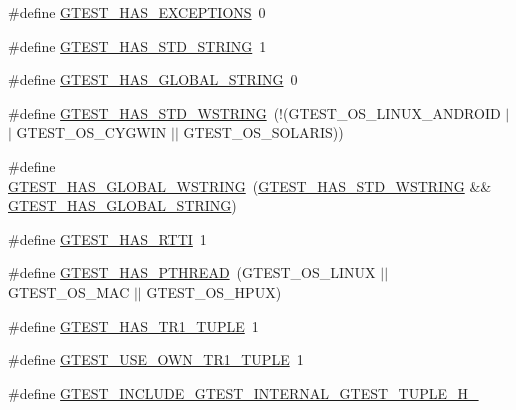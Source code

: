 \begin{DoxyCompactItemize}
\item 
\#define \hyperlink{fused-src_2gtest_2gtest_8h_aedcf220690e6589d0fc2bd3db768ea66}{\-G\-T\-E\-S\-T\-\_\-\-H\-A\-S\-\_\-\-E\-X\-C\-E\-P\-T\-I\-O\-N\-S}~0
\item 
\#define \hyperlink{fused-src_2gtest_2gtest_8h_adba1121430c11cee8ba0c74e8cf6aa40}{\-G\-T\-E\-S\-T\-\_\-\-H\-A\-S\-\_\-\-S\-T\-D\-\_\-\-S\-T\-R\-I\-N\-G}~1
\item 
\#define \hyperlink{fused-src_2gtest_2gtest_8h_a6ab57c4a17233dd4ed30c2926bb99cc5}{\-G\-T\-E\-S\-T\-\_\-\-H\-A\-S\-\_\-\-G\-L\-O\-B\-A\-L\-\_\-\-S\-T\-R\-I\-N\-G}~0
\item 
\#define \hyperlink{fused-src_2gtest_2gtest_8h_a6e087748d8bbd2ca57c487b6ad268670}{\-G\-T\-E\-S\-T\-\_\-\-H\-A\-S\-\_\-\-S\-T\-D\-\_\-\-W\-S\-T\-R\-I\-N\-G}~(!(\-G\-T\-E\-S\-T\-\_\-\-O\-S\-\_\-\-L\-I\-N\-U\-X\-\_\-\-A\-N\-D\-R\-O\-I\-D $|$$|$ \-G\-T\-E\-S\-T\-\_\-\-O\-S\-\_\-\-C\-Y\-G\-W\-I\-N $|$$|$ \-G\-T\-E\-S\-T\-\_\-\-O\-S\-\_\-\-S\-O\-L\-A\-R\-I\-S))
\item 
\#define \hyperlink{fused-src_2gtest_2gtest_8h_afca9ecaf5846561187a15b75013aa85b}{\-G\-T\-E\-S\-T\-\_\-\-H\-A\-S\-\_\-\-G\-L\-O\-B\-A\-L\-\_\-\-W\-S\-T\-R\-I\-N\-G}~(\hyperlink{gtest-port_8h_a6e087748d8bbd2ca57c487b6ad268670}{\-G\-T\-E\-S\-T\-\_\-\-H\-A\-S\-\_\-\-S\-T\-D\-\_\-\-W\-S\-T\-R\-I\-N\-G} \&\& \hyperlink{gtest-port_8h_a6ab57c4a17233dd4ed30c2926bb99cc5}{\-G\-T\-E\-S\-T\-\_\-\-H\-A\-S\-\_\-\-G\-L\-O\-B\-A\-L\-\_\-\-S\-T\-R\-I\-N\-G})
\item 
\#define \hyperlink{fused-src_2gtest_2gtest_8h_a9ba781217167f905bff2f1c410a97930}{\-G\-T\-E\-S\-T\-\_\-\-H\-A\-S\-\_\-\-R\-T\-T\-I}~1
\item 
\#define \hyperlink{fused-src_2gtest_2gtest_8h_a3341397e1952de0b9cd88762d4d3ae4b}{\-G\-T\-E\-S\-T\-\_\-\-H\-A\-S\-\_\-\-P\-T\-H\-R\-E\-A\-D}~(\-G\-T\-E\-S\-T\-\_\-\-O\-S\-\_\-\-L\-I\-N\-U\-X $|$$|$ \-G\-T\-E\-S\-T\-\_\-\-O\-S\-\_\-\-M\-A\-C $|$$|$ \-G\-T\-E\-S\-T\-\_\-\-O\-S\-\_\-\-H\-P\-U\-X)
\item 
\#define \hyperlink{fused-src_2gtest_2gtest_8h_a6de49dd4cbae1db15dc6edca3b179d1b}{\-G\-T\-E\-S\-T\-\_\-\-H\-A\-S\-\_\-\-T\-R1\-\_\-\-T\-U\-P\-L\-E}~1
\item 
\#define \hyperlink{fused-src_2gtest_2gtest_8h_afa144e5f5d039db0df873e7ad48c1fda}{\-G\-T\-E\-S\-T\-\_\-\-U\-S\-E\-\_\-\-O\-W\-N\-\_\-\-T\-R1\-\_\-\-T\-U\-P\-L\-E}~1
\item 
\#define \hyperlink{fused-src_2gtest_2gtest_8h_a3ae8480ec6608725dc397ccb312105b0}{\-G\-T\-E\-S\-T\-\_\-\-I\-N\-C\-L\-U\-D\-E\-\_\-\-G\-T\-E\-S\-T\-\_\-\-I\-N\-T\-E\-R\-N\-A\-L\-\_\-\-G\-T\-E\-S\-T\-\_\-\-T\-U\-P\-L\-E\-\_\-\-H\-\_\-}

\end{DoxyCompactItemize}
